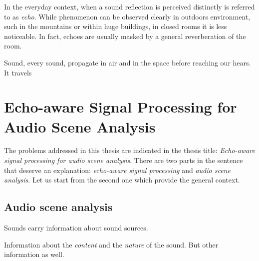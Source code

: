 
\lipsum[1]
In the everyday context, when a sound reflection is perceived distinctly is referred to as \textit{echo}.
While phenomenon can be observed clearly in outdoors environment, such in the mountains or within huge buildings, in closed rooms it is less noticeable.
In fact, echoes are usually masked by a general reverberation of the room.

Sound, every sound, propagate in air and in the space before reaching our hears.
It travels

\section{Echo-aware Signal Processing for Audio Scene Analysis}\label{sec:intro:problem}
The problems addressed in this thesis are indicated in the thesis title: \textit{Echo-aware signal processing for audio scene analysis}.
There are two parts in the sentence that deserve an explanation: \textit{echo-aware signal processing} and \textit{audio scene analysis}.
Let us start from the second one which provide the general context.

\subsection{Audio scene analysis}
Sounds carry information about sound sources.

Information about the \textit{content} and the \textit{nature} of the sound.
But other information as well.



